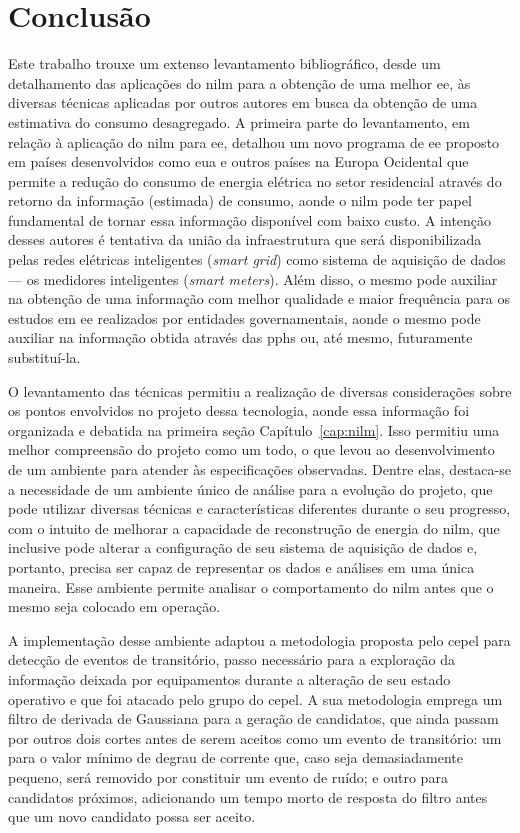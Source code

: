 \chapter{Conclusão}
\label{chap:conclusao}

Este trabalho trouxe um extenso levantamento bibliográfico, desde um
detalhamento das aplicações do \acs{nilm} para a obtenção de uma
melhor \acs{ee}, às diversas técnicas aplicadas por outros autores
em busca da obtenção de uma estimativa do consumo desagregado. A
primeira parte do levantamento, em relação à aplicação do \acs{nilm}
para \acs{ee}, detalhou um novo programa de \acs{ee} proposto em
países desenvolvidos como \acs{eua} e outros países na Europa
Ocidental que permite a redução do consumo de energia elétrica no
setor residencial através do retorno da informação (estimada) de
consumo, aonde o \acs{nilm} pode ter papel fundamental de tornar essa
informação disponível com baixo custo. A intenção desses autores é
tentativa da união da infraestrutura que será disponibilizada pelas
redes elétricas inteligentes (\emph{smart grid}) como sistema de
aquisição de dados --- os medidores inteligentes (\emph{smart
meters}). Além disso, o mesmo pode auxiliar na obtenção de uma
informação com melhor qualidade e maior frequência para os estudos em
\acs{ee} realizados por entidades governamentais, aonde o mesmo pode
auxiliar na informação obtida através das \glspl{pph} ou, até mesmo,
futuramente substituí-la.

O levantamento das técnicas permitiu a realização de diversas
considerações sobre os pontos envolvidos no projeto dessa tecnologia,
aonde essa informação foi organizada e debatida na primeira seção
Capítulo~\ref{cap:nilm}. Isso permitiu uma melhor compreensão do
projeto como um todo, o que levou ao desenvolvimento de um ambiente
para atender às especificações observadas. Dentre elas, destaca-se a
necessidade de um ambiente único de análise para a evolução do
projeto, que pode utilizar diversas técnicas e características
diferentes durante o seu progresso, com o intuito de melhorar a
capacidade de reconstrução de energia do \acs{nilm}, que inclusive
pode alterar a configuração de seu sistema de aquisição de dados e,
portanto, precisa ser capaz de representar os dados e análises em uma
única maneira. Esse ambiente permite analisar o comportamento do
\acs{nilm} antes que o mesmo seja colocado em operação.

A implementação desse ambiente adaptou a metodologia proposta pelo
\acs{cepel} para detecção de eventos de transitório, passo necessário
para a exploração da informação deixada por equipamentos durante a
alteração de seu estado operativo e que foi atacado pelo grupo do
\acs{cepel}. A sua metodologia emprega um filtro de derivada de
Gaussiana para a geração de candidatos, que ainda passam por outros
dois cortes antes de serem aceitos como um evento de transitório: um
para o valor mínimo de degrau de corrente que, caso seja
demasiadamente pequeno, será removido por constituir um evento de
ruído; e outro para candidatos próximos, adicionando um tempo morto de
resposta do filtro antes que um novo candidato possa ser aceito.

